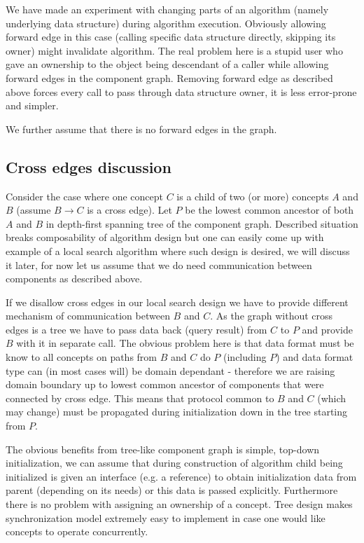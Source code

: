 We have made an experiment with changing parts of an algorithm (namely
underlying data structure) during algorithm execution. Obviously allowing
forward edge in this case (calling specific data structure directly, skipping
its owner) might invalidate algorithm. The real problem here is a stupid user
who gave an ownership to the object being descendant of a caller while allowing
forward edges in the component graph. Removing forward edge as described above
forces every call to pass through data structure owner, it is less error-prone
and simpler.

We further assume that there is no forward edges in the graph.

\subsection{Cross edges discussion}
Consider the case where one concept $C$ is a child of two (or more) concepts
$A$ and $B$ (assume $B \to C$ is a cross edge). Let $P$ be the lowest common
ancestor of both $A$ and $B$ in depth-first spanning tree of the component
graph. Described situation breaks composability of algorithm design but one can
easily come up with example of a local search algorithm where such design is
desired, we will discuss it later, for now let us assume that we do need
communication between components as described above.

If we disallow cross edges in our local search design we have to provide
different mechanism of communication between $B$ and $C$. As the graph without
cross edges is a tree we have to pass data back (query result) from $C$ to $P$
and provide $B$ with it in separate call. The obvious problem here is that data
format must be know to all concepts on paths from $B$ and $C$ do $P$ (including
$P$) and data format type can (in most cases will) be domain dependant -
therefore we are raising domain boundary up to lowest common ancestor of
components that were connected by cross edge. This means that protocol common
to $B$ and $C$ (which may change) must be propagated during initialization down
in the tree starting from $P$.

The obvious benefits from tree-like component graph is simple, top-down
initialization, we can assume that during construction of algorithm child being
initialized is given an interface (e.g. a reference) to obtain initialization
data from parent (depending on its needs) or this data is passed explicitly.
Furthermore there is no problem with assigning an ownership of a concept. Tree
design makes synchronization model extremely easy to implement in case one
would like concepts to operate concurrently.

